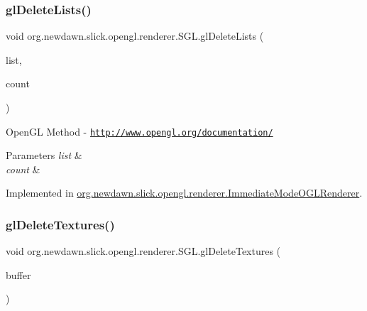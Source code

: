 \mbox{\label{interfaceorg_1_1newdawn_1_1slick_1_1opengl_1_1renderer_1_1_s_g_l_a06daf35b442a76f8d6ee62ae413fdd21}} 
\subsubsection{\texorpdfstring{gl\+Delete\+Lists()}{glDeleteLists()}}
{\footnotesize\ttfamily void org.\+newdawn.\+slick.\+opengl.\+renderer.\+S\+G\+L.\+gl\+Delete\+Lists (\begin{DoxyParamCaption}\item[{int}]{list,  }\item[{int}]{count }\end{DoxyParamCaption})}

Open\+GL Method -\/  \href{http://www.opengl.org/documentation/}{\tt http\+://www.\+opengl.\+org/documentation/}


\begin{DoxyParams}{Parameters}
{\em list} & \\
\hline
{\em count} & \\
\hline
\end{DoxyParams}


Implemented in \mbox{\hyperlink{classorg_1_1newdawn_1_1slick_1_1opengl_1_1renderer_1_1_immediate_mode_o_g_l_renderer_a47e9f1e741fe05b4649ecdb92bd2d119}{org.\+newdawn.\+slick.\+opengl.\+renderer.\+Immediate\+Mode\+O\+G\+L\+Renderer}}.

\mbox{\label{interfaceorg_1_1newdawn_1_1slick_1_1opengl_1_1renderer_1_1_s_g_l_a763a5728906baa94182a81ed3bb52ca0}} 
\subsubsection{\texorpdfstring{gl\+Delete\+Textures()}{glDeleteTextures()}}
{\footnotesize\ttfamily void org.\+newdawn.\+slick.\+opengl.\+renderer.\+S\+G\+L.\+gl\+Delete\+Textures (\begin{DoxyParamCaption}\item[{Int\+Buffer}]{buffer }\end{DoxyParamCaption})}

